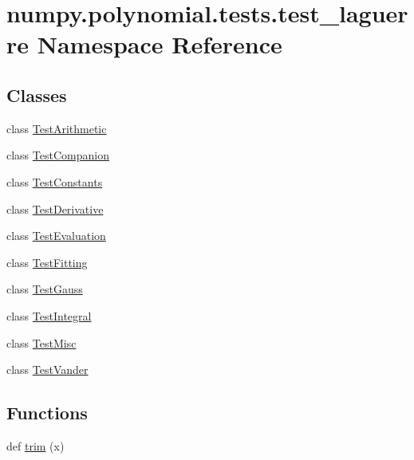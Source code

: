 \hypertarget{namespacenumpy_1_1polynomial_1_1tests_1_1test__laguerre}{}\section{numpy.\+polynomial.\+tests.\+test\+\_\+laguerre Namespace Reference}
\label{namespacenumpy_1_1polynomial_1_1tests_1_1test__laguerre}
\subsection*{Classes}
\begin{DoxyCompactItemize}
\item 
class \hyperlink{classnumpy_1_1polynomial_1_1tests_1_1test__laguerre_1_1TestArithmetic}{Test\+Arithmetic}
\item 
class \hyperlink{classnumpy_1_1polynomial_1_1tests_1_1test__laguerre_1_1TestCompanion}{Test\+Companion}
\item 
class \hyperlink{classnumpy_1_1polynomial_1_1tests_1_1test__laguerre_1_1TestConstants}{Test\+Constants}
\item 
class \hyperlink{classnumpy_1_1polynomial_1_1tests_1_1test__laguerre_1_1TestDerivative}{Test\+Derivative}
\item 
class \hyperlink{classnumpy_1_1polynomial_1_1tests_1_1test__laguerre_1_1TestEvaluation}{Test\+Evaluation}
\item 
class \hyperlink{classnumpy_1_1polynomial_1_1tests_1_1test__laguerre_1_1TestFitting}{Test\+Fitting}
\item 
class \hyperlink{classnumpy_1_1polynomial_1_1tests_1_1test__laguerre_1_1TestGauss}{Test\+Gauss}
\item 
class \hyperlink{classnumpy_1_1polynomial_1_1tests_1_1test__laguerre_1_1TestIntegral}{Test\+Integral}
\item 
class \hyperlink{classnumpy_1_1polynomial_1_1tests_1_1test__laguerre_1_1TestMisc}{Test\+Misc}
\item 
class \hyperlink{classnumpy_1_1polynomial_1_1tests_1_1test__laguerre_1_1TestVander}{Test\+Vander}
\end{DoxyCompactItemize}
\subsection*{Functions}
\begin{DoxyCompactItemize}
\item 
def \hyperlink{namespacenumpy_1_1polynomial_1_1tests_1_1test__laguerre_a828c70e70d8f81e6fb4583dfa0fc4b66}{trim} (x)
\end{DoxyCompactItemize}
